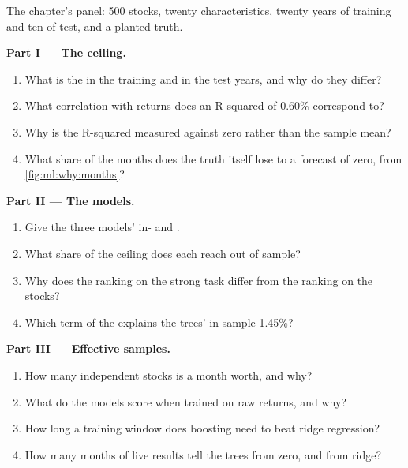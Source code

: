 \begin{problem}\label{pb:ml:why-financial-machine-learning-is-different:1}
The chapter's panel: 500 stocks, twenty characteristics, twenty years of training and ten of test, and a planted truth.

\medskip\noindent\textbf{Part I --- The ceiling.}
\begin{enumerate}
\item What is the  in the training and in the test years, and why do they differ?
\item What correlation with returns does an R-squared of 0.60\% correspond to?
\item Why is the R-squared measured against zero rather than the sample mean?
\item What share of the months does the truth itself lose to a forecast of zero, from \cref{fig:ml:why:months}?
\end{enumerate}

\medskip\noindent\textbf{Part II --- The models.}
\begin{enumerate}[resume]
\item Give the three models' in- and .
\item What share of the ceiling does each reach out of sample?
\item Why does the ranking on the strong task differ from the ranking on the stocks?
\item Which term of the  explains the trees' in-sample 1.45\%?
\end{enumerate}

\medskip\noindent\textbf{Part III --- Effective samples.}
\begin{enumerate}[resume]
\item How many independent stocks is a month worth, and why?
\item What do the models score when trained on raw returns, and why?
\item How long a training window does boosting need to beat ridge regression?
\item How many months of live results tell the trees from zero, and from ridge?
\end{enumerate}


\end{problem}
